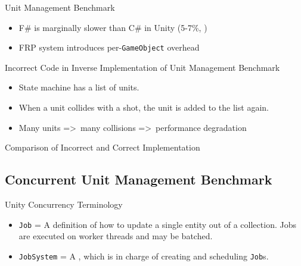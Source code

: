 
\begin{frame}{\secname}{\subsecname}
	Unit Management Benchmark
	\begin{itemize}
		\item F\# is marginally slower than C\# in Unity (5-7\%, \cite{maggiore2012formal,bolhuis2019gameplay})
		\item FRP system introduces per-\texttt{GameObject} overhead
	\end{itemize}
\end{frame}

\begin{frame}{\secname}{\subsecname}
	Incorrect Code in Inverse Implementation of Unit Management Benchmark
	\begin{itemize}
		\item State machine has a list of units.
		\item When a unit collides with a shot, the unit is added to the list again.
		\item Many units =\textgreater\ many collisions =\textgreater\ performance degradation
	\end{itemize}
\end{frame}

\begin{frame}[fragile]{\secname}{\subsecname}
	Comparison of Incorrect and Correct Implementation
\end{frame}

\subsection{Concurrent Unit Management Benchmark}

\begin{frame}{\secname}{\subsecname}
	Unity Concurrency Terminology
	\begin{itemize}
		\item \texttt{Job} = A definition of how to update a single entity out of a collection. Jobs are executed on worker threads and may be batched.
		\item \texttt{JobSystem} = A , which is in charge of creating and scheduling \texttt{Job}s.
	\end{itemize}
\end{frame}

